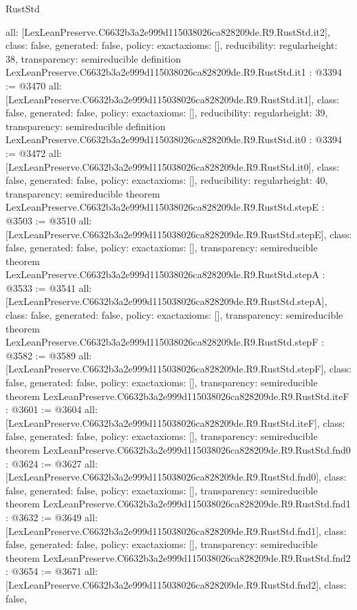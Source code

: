 \begin{lexlean}{RustStd}
\begin{coremodule}
{  all: [LexLeanPreserve.C6632b3a2e999d115038026ca828209de.R9.RustStd.it2],
  class: false,
  generated: false,
  policy: exact{axioms: []},
  reducibility: regular{height: 38},
  transparency: semireducible
}
definition LexLeanPreserve.C6632b3a2e999d115038026ca828209de.R9.RustStd.it1 : @3394 := @3470 {
  all: [LexLeanPreserve.C6632b3a2e999d115038026ca828209de.R9.RustStd.it1],
  class: false,
  generated: false,
  policy: exact{axioms: []},
  reducibility: regular{height: 39},
  transparency: semireducible
}
definition LexLeanPreserve.C6632b3a2e999d115038026ca828209de.R9.RustStd.it0 : @3394 := @3472 {
  all: [LexLeanPreserve.C6632b3a2e999d115038026ca828209de.R9.RustStd.it0],
  class: false,
  generated: false,
  policy: exact{axioms: []},
  reducibility: regular{height: 40},
  transparency: semireducible
}
theorem LexLeanPreserve.C6632b3a2e999d115038026ca828209de.R9.RustStd.stepE : @3503 := @3510 {
  all: [LexLeanPreserve.C6632b3a2e999d115038026ca828209de.R9.RustStd.stepE],
  class: false,
  generated: false,
  policy: exact{axioms: []},
  transparency: semireducible
}
theorem LexLeanPreserve.C6632b3a2e999d115038026ca828209de.R9.RustStd.stepA : @3533 := @3541 {
  all: [LexLeanPreserve.C6632b3a2e999d115038026ca828209de.R9.RustStd.stepA],
  class: false,
  generated: false,
  policy: exact{axioms: []},
  transparency: semireducible
}
theorem LexLeanPreserve.C6632b3a2e999d115038026ca828209de.R9.RustStd.stepF : @3582 := @3589 {
  all: [LexLeanPreserve.C6632b3a2e999d115038026ca828209de.R9.RustStd.stepF],
  class: false,
  generated: false,
  policy: exact{axioms: []},
  transparency: semireducible
}
theorem LexLeanPreserve.C6632b3a2e999d115038026ca828209de.R9.RustStd.iteF : @3601 := @3604 {
  all: [LexLeanPreserve.C6632b3a2e999d115038026ca828209de.R9.RustStd.iteF],
  class: false,
  generated: false,
  policy: exact{axioms: []},
  transparency: semireducible
}
theorem LexLeanPreserve.C6632b3a2e999d115038026ca828209de.R9.RustStd.fnd0 : @3624 := @3627 {
  all: [LexLeanPreserve.C6632b3a2e999d115038026ca828209de.R9.RustStd.fnd0],
  class: false,
  generated: false,
  policy: exact{axioms: []},
  transparency: semireducible
}
theorem LexLeanPreserve.C6632b3a2e999d115038026ca828209de.R9.RustStd.fnd1 : @3632 := @3649 {
  all: [LexLeanPreserve.C6632b3a2e999d115038026ca828209de.R9.RustStd.fnd1],
  class: false,
  generated: false,
  policy: exact{axioms: []},
  transparency: semireducible
}
theorem LexLeanPreserve.C6632b3a2e999d115038026ca828209de.R9.RustStd.fnd2 : @3654 := @3671 {
  all: [LexLeanPreserve.C6632b3a2e999d115038026ca828209de.R9.RustStd.fnd2],
  class: false,
}
\end{coremodule}
\end{lexlean}
